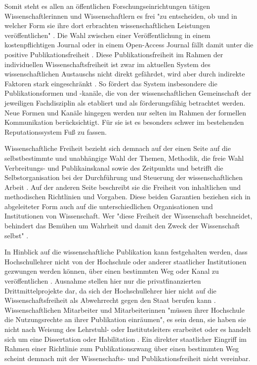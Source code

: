 Somit steht es allen an öffentlichen Forschungseinrichtungen tätigen Wissenschaftlerinnen und Wissenschaftlern es frei "zu entscheiden, ob und in welcher Form sie ihre dort erbrachten wissenschaftlichen Leistungen veröffentlichen" \cite{Schmidt_2009}. Die Wahl zwischen einer Veröffentlichung in einem kostenpflichtigen Journal oder in einem Open-Access Journal fällt damit unter die positive Publikationsfreiheit \cite[:190]{Fehling_2014}. Diese Publikationsfreiheit
im Rahmen der individuellen Wissenschaftsfreiheit ist zwar im aktuellen System des wissenschaftlichen Austauschs nicht direkt gefährdet, wird aber durch indirekte Faktoren stark eingeschränkt \cite{binswanger_2014_excellence}. So fördert das System insbesondere die Publikationsformen und -kanäle, die von der wissenschaftlichen Gemeinschaft der jeweiligen Fachdisziplin als etabliert und als förderungsfähig betrachtet werden. Neue Formen und Kanäle hingegen werden nur selten im Rahmen der formellen Kommunikation berücksichtigt. Für sie ist es besonders schwer im bestehenden Reputationssystem Fuß zu fassen.

Wissenschaftliche Freiheit bezieht sich demnach auf der einen Seite auf die selbstbestimmte und unabhängige Wahl der Themen, Methodik, die freie Wahl Verbreitungs- und Publikainskanal sowie des Zeitpunkts und betrifft die Selbstorganisation bei der Durchführung und Steuerung der wissenschaftlichen Arbeit \cite{Fehling_2014}. Auf der anderen Seite beschreibt sie die Freiheit von inhaltlichen und methodischen Richtlinien und Vorgaben. Diese beiden Garantien beziehen sich in abgeleiteter Form auch auf die unterschiedlichen Organisationen und Institutionen von Wissenschaft. Wer "diese Freiheit der Wissenschaft beschneidet, behindert das Bemühen um Wahrheit und damit den Zweck der Wissenschaft selbst" \cite{Oezmen_2015}.

In Hinblick auf die wissenschaftliche Publikation kann festgehalten werden, dass Hochschullehrer nicht von der Hochschule oder anderer staatlicher Institutionen gezwungen werden können, über einen bestimmten Weg oder Kanal zu veröffentlichen \cite{spindler_2006_rechtloa} \cite{dorschel_2006_open}. Ausnahme stellen hier nur die privatfinanzierten Drittmittelprojekte dar, da sich der Hochschullehrer hier nicht auf die Wissenschaftsfreiheit als Abwehrrecht gegen den Staat berufen kann \cite{spindler_2006_rechtloa}. Wissenschaftlichen Mitarbeiter und Mitarbeiterinnen "müssen ihrer Hochschule die Nutzungsrechte an ihrer Publikation einräumen", es sein denn, sie haben sie nicht nach Weisung des Lehrstuhl- oder Institutsleiters erarbeitet oder es handelt sich um eine Dissertation oder Habilitation \cite{spindler_2006_rechtloa}. Ein direkter staatlicher Eingriff im Rahmen einer Richtlinie zum Publikationszwang über einen bestimmten Weg scheint demnach mit der Wissenschafts- und Publikationsfreiheit nicht vereinbar.

